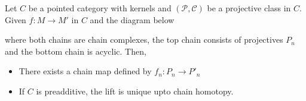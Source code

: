 \documentclass{article}
\begin{document}
\begin{theorem}
    Let $C$ be a pointed category with kernels and $(\mathcal{P}, \mathcal{C})$ be a projective class in $C$. Given $f: M \to M'$ in $C$ and the diagram below
    \begin{center}
    \end{center}

    where both chains are chain complexes, the top chain consists of projectives $P_n$ and the bottom chain is acyclic. Then,
    \begin{itemize}
        \item There exists a chain map defined by $f_n: P_n \to P'_n$
        \item If $C$ is preadditive, the lift is unique upto chain homotopy.
    \end{itemize}
\end{theorem}
\end{document}

